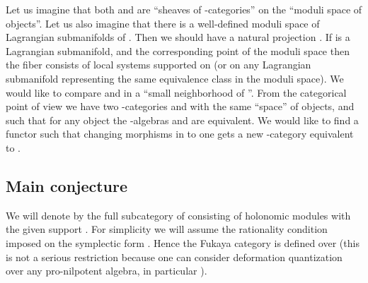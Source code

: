 \documentclass[a4paper,12pt]{article}
\begin{document}
Let us imagine that both \coordHE{} and \coordHE{} are ``sheaves of 
\myHighlight{$\A$}\coordHE{}-categories'' on the ``moduli space of objects''.
 Let us also imagine that there is
a well-defined moduli space \coordHE{} of Lagrangian submanifolds
of \coordHE{}. Then we should have a natural projection
\coordHE{}. If \coordHE{} is a Lagrangian submanifold,
and \coordHE{} the corresponding point of the moduli space then the fiber
\coordHE{} consists of local systems supported on \coordHE{}
(or on any Lagrangian submanifold representing the same equivalence class
in the moduli space). We would like to compare \coordHE{} and \coordHE{}
in a ``small neighborhood of \myHighlight{$[(L,\rho)]$}\coordHE{}''. From the categorical 
point of view we have two \myHighlight{$\A$}\coordHE{}-categories \coordHE{} and \coordHE{} with the same ``space'' of 
objects, and such that for any object \coordHE{} the \myHighlight{$\A$}\coordHE{}-algebras \coordHE{}
and  \coordHE{} are equivalent.
We would like to find a functor \coordHE{} such that
changing morphisms in \coordHE{} to \coordHE{} one gets a new \myHighlight{$\A$}\coordHE{}-category equivalent to \coordHE{}.




\subsection{Main conjecture}



We will denote by \coordHE{} the full subcategory
of \coordHE{} consisting of holonomic modules with the given
support \coordHE{}. For simplicity we will assume the rationality condition
imposed on the symplectic form \myHighlight{$\omega$}\coordHE{}. Hence the Fukaya category
is defined over \coordHE{} (this is not a serious restriction because one can consider
deformation quantization over any pro-nilpotent algebra, in particular \myHighlight{$\C_{\varepsilon}$}\coordHE{}).
\end{document}
